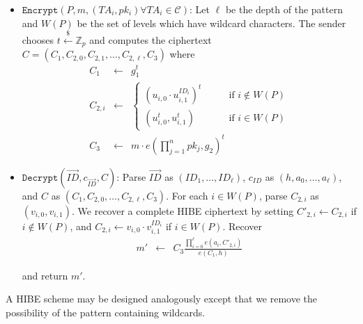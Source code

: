 \documentclass[10pt]{llncs}
\newcommand{\C}{\mathcal{C}}
\newcommand{\Zbb}{\mathbb{Z}}
\newcommand{\ID}{\mathit{ID}}
\newcommand{\TA}{\mathit{TA}}
\newcommand{\getsr}{\stackrel{{\scriptscriptstyle\$}}{\gets}}
\begin{document}
\begin{itemize}
\item $\texttt{Encrypt}(\mathit{P},m, (\TA_i, pk_i) \forall \TA_i \in \C)$: Let $\ell$ be the depth of the pattern and $W(P)$ be the set of levels which have wildcard characters. The sender chooses $t\getsr \Zbb_{p}$ and computes the ciphertext $C=(C_{1},C_{2,0},C_{2,1},...,C_{2,\ell},C_{3})$ where
\begin{eqnarray*}
	C_{1} & \gets & g_{1}^{t} \\
	C_{2,i} & \gets & \left\{
		\begin{array}{ll}
			(u_{i,0} \cdot u_{i,1}^{\ID_{i}})^{t} & \qquad \mbox{if } i \notin W(P) \\
			(u_{i,0}^{t},u_{i,1}^{t}) & \qquad \mbox{if } i \in W(P)
		\end{array}
	\right. \\
	C_{3} &\gets& m \cdot e(\prod_{j=1}^{n} pk_j,g_{2})^{t}
\end{eqnarray*}

\item $\texttt{Decrypt}(\vec{\ID},c_{\vec{\ID}},C)$: Parse $\vec{\ID}$ as $(\ID_{1},\ldots,\ID_{\ell})$, $c_{\ID}$ as $(h,a_{0},\ldots,a_{\ell})$, and $C$ as $(C_{1},C_{2,0},\ldots,C_{2,\ell},C_{3})$. For each $i\in W(P)$, parse $C_{2,i}$ as $(v_{i,0},v_{i,1})$. We recover a complete HIBE ciphertext by setting $C'_{2,i} \gets C_{2,i}$ if $i\notin W(P)$, and $C_{2,i}\gets v_{i,0} \cdot v_{i,1}^{\ID_{i}}$ if $i\in W(P)$. Recover
\begin{eqnarray*}
	m' & \gets & C_{3} \frac{\prod_{i=0}^{\ell} e(a_{i},C'_{2,i})}{e(C_{1},h)}
\end{eqnarray*}

and return $m'$.
\end{itemize}

A HIBE scheme may be designed analogously except that we remove the possibility of the pattern containing wildcards.
\end{document}
